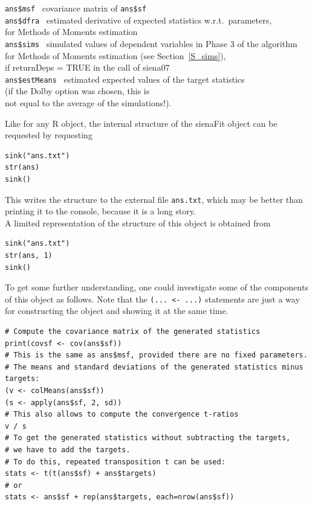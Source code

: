 \documentclass[a4paper,fleqn,11pt]{article}
\newcommand{\+}{\, + \,}
\newcommand{\R}{{\sf R }}
\begin{document}
\begin{tabbing}
 \texttt{ans\$msf   }                 \>  covariance matrix of
                                           \texttt{ans\$sf    } \\
 \texttt{ans\$dfra  }                 \> estimated derivative of expected
                                            statistics w.r.t.\ parameters,  \\
                                     \>   for Methods of Moments estimation  \\
 \texttt{ans\$sims }               \> simulated values of dependent variables
                                      in Phase 3 of the algorithm     \\
                                    \>     for Methods of Moments estimation
                                        (see Section~\ref{S_sims}),    \\
                                       \>  if \textsf{returnDeps = TRUE}
                                        in the call of \textsf{siena07} \\
 \texttt{ans\$estMeans }               \> estimated expected values of the target statistics\\
                                     \> (if the Dolby option was chosen, this is \\
                                     \> not equal to the average of the simulations!).
\end{tabbing}
Like for any \R object, the internal structure of the \textsf{sienaFit} object
can be requested by requesting
\begin{verbatim}
sink("ans.txt")
str(ans)
sink()
\end{verbatim}
This writes the structure to the external file \texttt{ans.txt}, which may
be better than printing it to the console, because it is a long story.\\
A limited representation of the structure of this object is obtained from
\begin{verbatim}
sink("ans.txt")
str(ans, 1)
sink()
\end{verbatim}

To get some further understanding, one could investigate some of the components
of this object as follows.
Note that the \texttt{(... <- ...)} statements are just a way for
constructing the object and showing it at the same time.
\begin{verbatim}
# Compute the covariance matrix of the generated statistics
print(covsf <- cov(ans$sf))
# This is the same as ans$msf, provided there are no fixed parameters.
# The means and standard deviations of the generated statistics minus targets:
(v <- colMeans(ans$sf))
(s <- apply(ans$sf, 2, sd))
# This also allows to compute the convergence t-ratios
v / s
# To get the generated statistics without subtracting the targets,
# we have to add the targets.
# To do this, repeated transposition t can be used:
stats <- t(t(ans$sf) + ans$targets)
# or
stats <- ans$sf + rep(ans$targets, each=nrow(ans$sf))
\end{verbatim}
\end{document}
